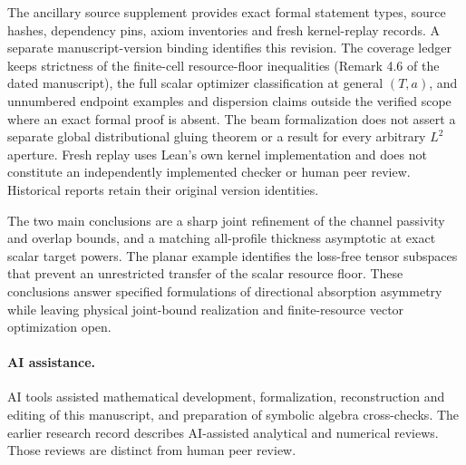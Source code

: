 \documentclass[11pt,a4paper]{article}
\theoremstyle{remark}
\begin{document}
The ancillary source supplement provides exact formal statement types, source hashes, dependency pins, axiom inventories and fresh kernel-replay records. A separate manuscript-version binding identifies this revision. The coverage ledger keeps strictness of the finite-cell resource-floor inequalities (Remark 4.6 of the dated manuscript), the full scalar optimizer classification at general $(T,a)$, and unnumbered endpoint examples and dispersion claims outside the verified scope where an exact formal proof is absent. The beam formalization does not assert a separate global distributional gluing theorem or a result for every arbitrary $L^2$ aperture. Fresh replay uses Lean's own kernel implementation and does not constitute an independently implemented checker or human peer review. Historical reports retain their original version identities.

The two main conclusions are a sharp joint refinement of the channel passivity and overlap bounds, and a matching all-profile thickness asymptotic at exact scalar target powers. The planar example identifies the loss-free tensor subspaces that prevent an unrestricted transfer of the scalar resource floor. These conclusions answer specified formulations of directional absorption asymmetry while leaving physical joint-bound realization and finite-resource vector optimization open.

\paragraph{AI assistance.} AI tools assisted mathematical development, formalization, reconstruction and editing of this manuscript, and preparation of symbolic algebra cross-checks. The earlier research record describes AI-assisted analytical and numerical reviews. Those reviews are distinct from human peer review.



\end{document}
